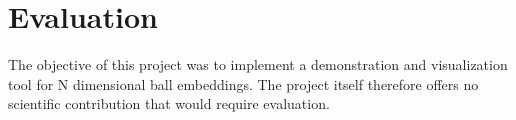 \chapter{Evaluation}

The objective of this project was to implement a demonstration and visualization tool for N dimensional ball embeddings. The project itself therefore offers no scientific contribution that would require evaluation.